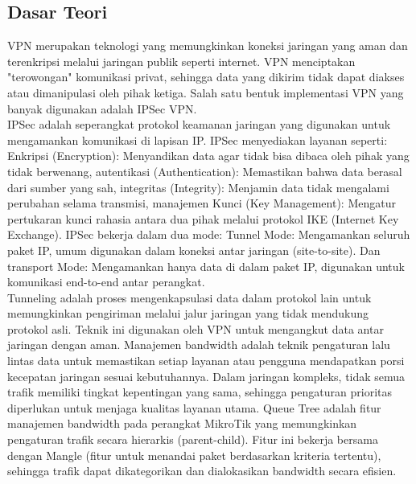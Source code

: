 \subsection{Dasar Teori}
VPN merupakan teknologi yang memungkinkan koneksi jaringan yang aman dan terenkripsi melalui jaringan publik seperti internet. VPN menciptakan "terowongan" komunikasi privat, sehingga data yang dikirim tidak dapat diakses atau dimanipulasi oleh pihak ketiga. Salah satu bentuk implementasi VPN yang banyak digunakan adalah IPSec VPN. \\ IPSec adalah seperangkat protokol keamanan jaringan yang digunakan untuk mengamankan komunikasi di lapisan IP. IPSec menyediakan layanan seperti: Enkripsi (Encryption): Menyandikan data agar tidak bisa dibaca oleh pihak yang tidak berwenang, autentikasi (Authentication): Memastikan bahwa data berasal dari sumber yang sah, integritas (Integrity): Menjamin data tidak mengalami perubahan selama transmisi, manajemen Kunci (Key Management): Mengatur pertukaran kunci rahasia antara dua pihak melalui protokol IKE (Internet Key Exchange). IPSec bekerja dalam dua mode: Tunnel Mode: Mengamankan seluruh paket IP, umum digunakan dalam koneksi antar jaringan (site-to-site). Dan transport Mode: Mengamankan hanya data di dalam paket IP, digunakan untuk komunikasi end-to-end antar perangkat. \\ Tunneling adalah proses mengenkapsulasi data dalam protokol lain untuk memungkinkan pengiriman melalui jalur jaringan yang tidak mendukung protokol asli. Teknik ini digunakan oleh VPN untuk mengangkut data antar jaringan dengan aman. Manajemen bandwidth adalah teknik pengaturan lalu lintas data untuk memastikan setiap layanan atau pengguna mendapatkan porsi kecepatan jaringan sesuai kebutuhannya. Dalam jaringan kompleks, tidak semua trafik memiliki tingkat kepentingan yang sama, sehingga pengaturan prioritas diperlukan untuk menjaga kualitas layanan utama. Queue Tree adalah fitur manajemen bandwidth pada perangkat MikroTik yang memungkinkan pengaturan trafik secara hierarkis (parent-child). Fitur ini bekerja bersama dengan Mangle (fitur untuk menandai paket berdasarkan kriteria tertentu), sehingga trafik dapat dikategorikan dan dialokasikan bandwidth secara efisien.

